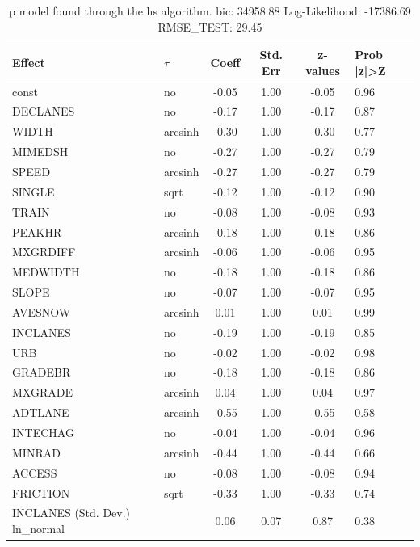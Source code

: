 \begin{table}
	\caption{p model found through the hs algorithm. bic: 34958.88 Log-Likelihood: -17386.69 RMSE_TEST: 29.45}
	\begin{center}
		\begin{tabular}{|l|l|c|c|c|l|}
			\hline
			Effect & $\tau$ & Coeff & Std. Err & z-values & Prob |z|>Z \\
			\hline
			const & no & -0.05 & 1.00 & -0.05 & 0.96 \\
			\hline
			DECLANES & no & -0.17 & 1.00 & -0.17 & 0.87 \\
			\hline
			WIDTH & arcsinh & -0.30 & 1.00 & -0.30 & 0.77 \\
			\hline
			MIMEDSH & no & -0.27 & 1.00 & -0.27 & 0.79 \\
			\hline
			SPEED & arcsinh & -0.27 & 1.00 & -0.27 & 0.79 \\
			\hline
			SINGLE & sqrt & -0.12 & 1.00 & -0.12 & 0.90 \\
			\hline
			TRAIN & no & -0.08 & 1.00 & -0.08 & 0.93 \\
			\hline
			PEAKHR & arcsinh & -0.18 & 1.00 & -0.18 & 0.86 \\
			\hline
			MXGRDIFF & arcsinh & -0.06 & 1.00 & -0.06 & 0.95 \\
			\hline
			MEDWIDTH & no & -0.18 & 1.00 & -0.18 & 0.86 \\
			\hline
			SLOPE & no & -0.07 & 1.00 & -0.07 & 0.95 \\
			\hline
			AVESNOW & arcsinh & 0.01 & 1.00 & 0.01 & 0.99 \\
			\hline
			INCLANES & no & -0.19 & 1.00 & -0.19 & 0.85 \\
			\hline
			URB & no & -0.02 & 1.00 & -0.02 & 0.98 \\
			\hline
			GRADEBR & no & -0.18 & 1.00 & -0.18 & 0.86 \\
			\hline
			MXGRADE & arcsinh & 0.04 & 1.00 & 0.04 & 0.97 \\
			\hline
			ADTLANE & arcsinh & -0.55 & 1.00 & -0.55 & 0.58 \\
			\hline
			INTECHAG & no & -0.04 & 1.00 & -0.04 & 0.96 \\
			\hline
			MINRAD & arcsinh & -0.44 & 1.00 & -0.44 & 0.66 \\
			\hline
			ACCESS & no & -0.08 & 1.00 & -0.08 & 0.94 \\
			\hline
			FRICTION & sqrt & -0.33 & 1.00 & -0.33 & 0.74 \\
			\hline
			INCLANES (Std. Dev.) ln_normal &  & 0.06 & 0.07 & 0.87 & 0.38 \\

\end{tabular}
\end{center}
\end{table}
